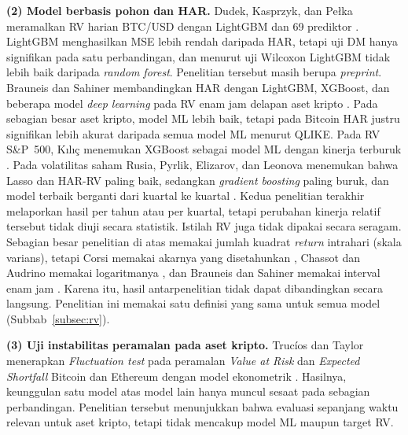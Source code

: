 \textbf{(2) Model berbasis pohon dan HAR.} Dudek, Kasprzyk, dan Pełka meramalkan RV
harian BTC/USD dengan LightGBM dan 69 prediktor \cite{dudek2025lgbm}. LightGBM
menghasilkan MSE lebih rendah daripada HAR, tetapi uji DM hanya signifikan
pada satu perbandingan, dan menurut uji Wilcoxon LightGBM tidak lebih baik
daripada \textit{random forest}. Penelitian tersebut masih berupa
\textit{preprint}. Brauneis dan Sahiner membandingkan HAR dengan LightGBM,
XGBoost, dan beberapa model \textit{deep learning} pada RV enam jam delapan
aset kripto \cite{brauneis2026}. Pada sebagian besar aset kripto, model ML
lebih baik, tetapi pada Bitcoin HAR justru signifikan lebih akurat daripada
semua model ML menurut QLIKE. Pada RV S\&P~500, Kılıç menemukan XGBoost sebagai
model ML dengan kinerja terburuk \cite{kilic2025}.
Pada volatilitas saham Rusia, Pyrlik, Elizarov, dan Leonova menemukan
bahwa Lasso dan HAR-RV paling baik, sedangkan \textit{gradient boosting}
paling buruk, dan model terbaik berganti dari kuartal ke kuartal
\cite{pyrlik2021}. Kedua penelitian terakhir melaporkan hasil per tahun atau
per kuartal, tetapi perubahan kinerja relatif tersebut tidak diuji secara
statistik. Istilah RV juga tidak dipakai secara seragam. Sebagian besar
penelitian di atas memakai jumlah kuadrat \textit{return} intrahari (skala
varians), tetapi Corsi memakai akarnya yang disetahunkan \cite{corsi2009},
Chassot dan Audrino memakai logaritmanya \cite{chassot2026}, dan Brauneis dan
Sahiner memakai interval enam jam \cite{brauneis2026}. Karena itu, hasil
antarpenelitian tidak dapat dibandingkan secara langsung. Penelitian ini
memakai satu definisi yang sama untuk semua model
(Subbab~\ref{subsec:rv}).

\textbf{(3) Uji instabilitas peramalan pada aset kripto.} Trucíos dan Taylor
menerapkan \textit{Fluctuation test} pada peramalan \textit{Value at Risk} dan
\textit{Expected Shortfall} Bitcoin dan Ethereum dengan model ekonometrik
\cite{trucios2023}. Hasilnya, keunggulan satu model atas model lain hanya
muncul sesaat pada sebagian perbandingan. Penelitian tersebut menunjukkan bahwa evaluasi sepanjang waktu
relevan untuk aset kripto, tetapi tidak mencakup model ML maupun target RV.

